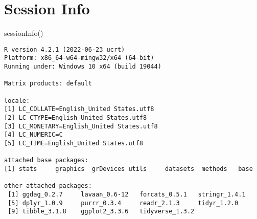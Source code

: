 \documentclass[
  letterpaper,
  DIV=11,
  numbers=noendperiod]{scrreprt}
\newenvironment{Shaded}{\begin{snugshade}}{\end{snugshade}}
\newcommand{\FunctionTok}[1]{\textcolor[rgb]{0.28,0.35,0.67}{#1}}
\newcommand{\NormalTok}[1]{\textcolor[rgb]{0.00,0.23,0.31}{#1}}
\begin{document}
\hypertarget{session-info}{%
\section{Session Info}\label{session-info}}

\begin{Shaded}
\begin{Highlighting}[]
\FunctionTok{sessionInfo}\NormalTok{()}
\end{Highlighting}
\end{Shaded}

\begin{verbatim}
R version 4.2.1 (2022-06-23 ucrt)
Platform: x86_64-w64-mingw32/x64 (64-bit)
Running under: Windows 10 x64 (build 19044)

Matrix products: default

locale:
[1] LC_COLLATE=English_United States.utf8 
[2] LC_CTYPE=English_United States.utf8   
[3] LC_MONETARY=English_United States.utf8
[4] LC_NUMERIC=C                          
[5] LC_TIME=English_United States.utf8    

attached base packages:
[1] stats     graphics  grDevices utils     datasets  methods   base     

other attached packages:
 [1] ggdag_0.2.7     lavaan_0.6-12   forcats_0.5.1   stringr_1.4.1  
 [5] dplyr_1.0.9     purrr_0.3.4     readr_2.1.3     tidyr_1.2.0    
 [9] tibble_3.1.8    ggplot2_3.3.6   tidyverse_1.3.2


\end{verbatim}
\end{document}
